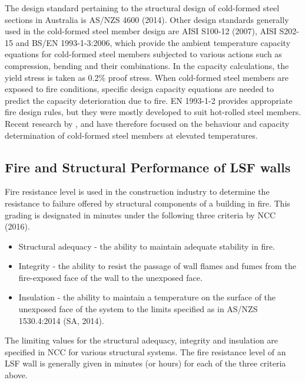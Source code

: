 The design standard pertaining to the structural design of cold-formed steel sections in Australia is AS/NZS 4600 (2014). Other design standards generally used in the cold-formed steel member design are AISI S100-12 (2007), AISI S202-15 and BS/EN 1993-1-3:2006, which  provide the ambient temperature capacity equations for cold-formed steel members subjected to various actions such as compression, bending and their combinations. In the capacity calculations, the yield stress is taken as 0.2\% proof stress. When cold-formed steel members are exposed to fire conditions, specific design capacity equations are needed to predict the capacity deterioration due to fire. EN 1993-1-2 provides appropriate fire design rules, but they were mostly developed to suit hot-rolled steel members. Recent research by \citet{Ranawaka2009a}, \citet{Kankanamge2011} and \citet{Rokilan2019} have therefore focused on the behaviour and capacity determination of cold-formed steel members at elevated temperatures.

\subsection{Fire and Structural Performance of LSF walls}

Fire resistance level is used in the construction industry to determine the resistance to failure offered by structural components of a building in fire. This grading is designated in minutes under the following three criteria by NCC (2016).

\begin{itemize}
\item Structural adequacy - the ability to maintain adequate stability in fire.
\item Integrity - the ability to resist the passage of wall flames and fumes from the fire-exposed face of the wall to the unexposed face. 
\item Insulation - the ability to maintain a temperature on the surface of the unexposed face of the system to the limits specified as in AS/NZS 1530.4:2014 (SA, 2014).
\end{itemize}

The limiting values for the structural adequacy, integrity and insulation are specified in  NCC for various structural systems. The fire resistance level of an LSF wall is generally given in minutes (or hours) for each of the three criteria above.

